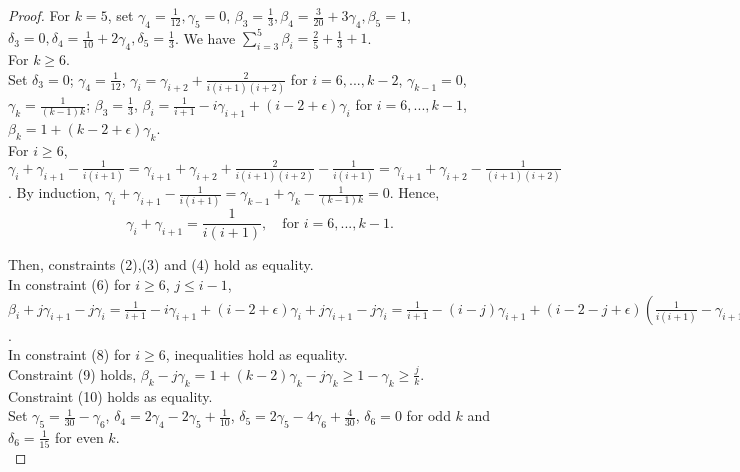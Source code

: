 \documentclass[runningheads,a4paper]{llncs}
\numberwithin{equation}{section}
\begin{document}
\begin{proof}
For $k=5$, set $\gamma_4=\frac{1}{12},\gamma_5=0$, $\beta_3=\frac{1}{3}, \beta_4=\frac{3}{20}+3\gamma_4, \beta_5=1$, $\delta_3=0,\delta_4=\frac{1}{10}+2\gamma_4,\delta_5=\frac{1}{3}$. We have $\sum_{i=3}^5\beta_i =\frac{2}{5}+\frac{1}{3}+1$. \\

For $k\geq 6$.\\

Set $\delta_3=0$; $\gamma_4=\frac{1}{12}$, $\gamma_i=\gamma_{i+2}+\frac{2}{i(i+1)(i+2)}$ for $i=6,...,k-2$, $\gamma_{k-1}=0$, $\gamma_k=\frac{1}{(k-1)k}$; $\beta_3=\frac{1}{3}$, $\beta_i=\frac{1}{i+1}-i\gamma_{i+1}+(i-2+\epsilon)\gamma_i$ for $i=6,...,k-1$, $\beta_k=1+(k-2+\epsilon)\gamma_k$. \\

For $i\geq 6$, $\gamma_i+\gamma_{i+1}-\frac{1}{i(i+1)}=\gamma_{i+1}+\gamma_{i+2}+\frac{2}{i(i+1)(i+2)}-\frac{1}{i(i+1)}=\gamma_{i+1}+\gamma_{i+2}-\frac{1}{(i+1)(i+2)}$. By induction, $\gamma_i+\gamma_{i+1}-\frac{1}{i(i+1)}=\gamma_{k-1}+\gamma_{k}-\frac{1}{(k-1)k}=0$. Hence,
\begin{equation}
\gamma_i+\gamma_{i+1}=\frac{1}{i(i+1)}, \quad \textrm{for }i=6,...,k-1. \nonumber
\end{equation}

Then, constraints (2),(3) and (4) hold as equality. \\

In constraint (6) for $i\geq 6$, $j\leq i-1$, $\beta_i+j\gamma_{i+1}-j\gamma_i=\frac{1}{i+1}-i\gamma_{i+1}+(i-2+\epsilon)\gamma_i+j\gamma_{i+1}-j\gamma_i=\frac{1}{i+1}-(i-j)\gamma_{i+1}+(i-2-j+\epsilon)(\frac{1}{i(i+1)}-\gamma_{i+1})
=\frac{1}{i+1}(1+\frac{i-j-2+\epsilon}{i})-(2i-2-2j+\epsilon)\gamma_{i+1}\geq\frac{1}{i+1}+\frac{i-2-j+\epsilon}{i(i+1)}-\frac{2i-2-2j+\epsilon}{i(i+1)}=\frac{j}{i(i+1)}$. \\

In constraint (8) for $i\geq 6$, inequalities hold as equality. \\

Constraint (9) holds, $\beta_k-j\gamma_k=1+(k-2)\gamma_k-j\gamma_k\geq 1-\gamma_k\geq \frac{j}{k}$. \\

Constraint (10) holds as equality. \\

Set $\gamma_5=\frac{1}{30}-\gamma_6$, $\delta_4=2\gamma_4-2\gamma_5+\frac{1}{10}$, $\delta_5=2\gamma_5-4\gamma_6+\frac{4}{30}$, $\delta_6=0$ for odd $k$ and $\delta_6=\frac{1}{15}$ for even $k$. \\


\end{proof}
\end{document}
